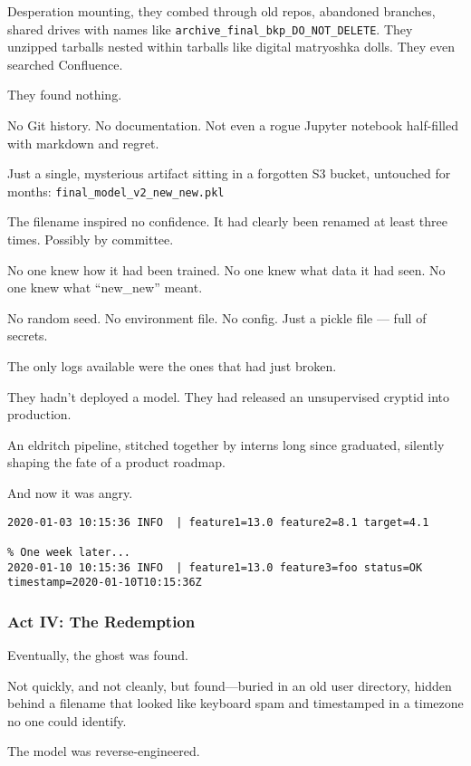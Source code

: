 Desperation mounting, they combed through old repos, abandoned branches, shared drives with names like \texttt{archive\_final\_bkp\_DO\_NOT\_DELETE}. They unzipped tarballs nested within tarballs like digital matryoshka dolls. They even searched Confluence.

They found nothing.

No Git history. No documentation. Not even a rogue Jupyter notebook half-filled with markdown and regret.

Just a single, mysterious artifact sitting in a forgotten S3 bucket, untouched for months:  
\texttt{final\_model\_v2\_new\_new.pkl}

The filename inspired no confidence. It had clearly been renamed at least three times. Possibly by committee.

No one knew how it had been trained.  
No one knew what data it had seen.  
No one knew what “new\_new” meant.

No random seed. No environment file. No config. Just a pickle file — full of secrets.

The only logs available were the ones that had just broken.

They hadn’t deployed a model.  
They had released an unsupervised cryptid into production.

An eldritch pipeline, stitched together by interns long since graduated, silently shaping the fate of a product roadmap.

And now it was angry.

\begin{lstlisting}[caption={The log that broke the build}, label={lst:falllogs}, basicstyle=\ttfamily\small, frame=single]
2020-01-03 10:15:36 INFO  | feature1=13.0 feature2=8.1 target=4.1

% One week later...
2020-01-10 10:15:36 INFO  | feature1=13.0 feature3=foo status=OK timestamp=2020-01-10T10:15:36Z
\end{lstlisting}

\subsubsection{Act IV: The Redemption}

Eventually, the ghost was found.

Not quickly, and not cleanly, but found---buried in an old user directory, hidden behind a filename that looked like keyboard spam and timestamped in a timezone no one could identify.

The model was reverse-engineered.

